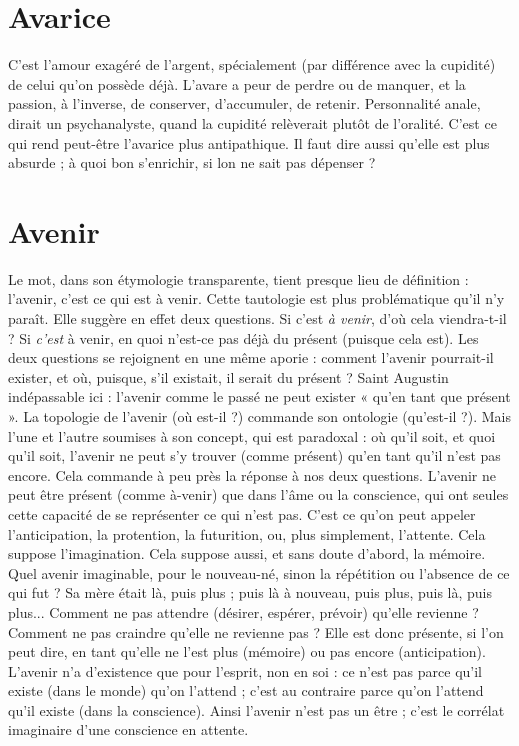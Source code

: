 \section{Avarice}
C'est l’amour exagéré de l’argent, spécialement (par différence
avec la cupidité) de celui qu’on possède déjà. L’avare a peur de
perdre ou de manquer, et la passion, à l'inverse, de conserver, d’accumuler, de
retenir. Personnalité anale, dirait un psychanalyste, quand la cupidité relèverait
plutôt de l’oralité. C’est ce qui rend peut-être l’avarice plus antipathique. Il faut
dire aussi qu’elle est plus absurde ; à quoi bon s'enrichir, si lon ne sait pas
dépenser ?

\section{Avenir}
Le mot, dans son étymologie transparente, tient presque lieu de
définition : l'avenir, c’est ce qui est à venir. Cette tautologie est
plus problématique qu’il n’y paraît. Elle suggère en effet deux questions. Si
c’est {\it à venir}, d'où cela viendra-t-il ? Si {\it c'est} à venir, en quoi n’est-ce pas déjà
du présent (puisque cela est). Les deux questions se rejoignent en une même
aporie : comment l’avenir pourrait-il exister, et où, puisque, s’il existait, il
serait du présent ? Saint Augustin indépassable ici : l'avenir comme le passé
ne peut exister « qu’en tant que présent ». La topologie de l’avenir (où est-il ?)
commande son ontologie (qu’est-il ?). Mais l’une et l’autre soumises à
son concept, qui est paradoxal : où qu’il soit, et quoi qu’il soit, l’avenir ne
peut s’y trouver (comme présent) qu’en tant qu’il n’est pas encore. Cela
commande à peu près la réponse à nos deux questions. L'avenir ne peut être
présent (comme à-venir) que dans l’âme ou la conscience, qui ont seules
cette capacité de se représenter ce qui n’est pas. C’est ce qu’on peut appeler
l’anticipation, la protention, la futurition, ou, plus simplement, l’attente.
Cela suppose l'imagination. Cela suppose aussi, et sans doute d’abord, la
mémoire. Quel avenir imaginable, pour le nouveau-né, sinon la répétition
ou l’absence de ce qui fut ? Sa mère était là, puis plus ; puis là à nouveau,
puis plus, puis là, puis plus... Comment ne pas attendre (désirer, espérer,
prévoir) qu’elle revienne ? Comment ne pas craindre qu’elle ne revienne
pas ? Elle est donc présente, si l’on peut dire, en tant qu’elle ne l’est plus
(mémoire) ou pas encore (anticipation). L’avenir n’a d’existence que pour
l'esprit, non en soi : ce n’est pas parce qu’il existe (dans le monde) qu’on
l'attend ; c’est au contraire parce qu’on l’attend qu’il existe (dans la conscience).
Ainsi l’avenir n’est pas un être ; c’est le corrélat imaginaire d’une
conscience en attente.

